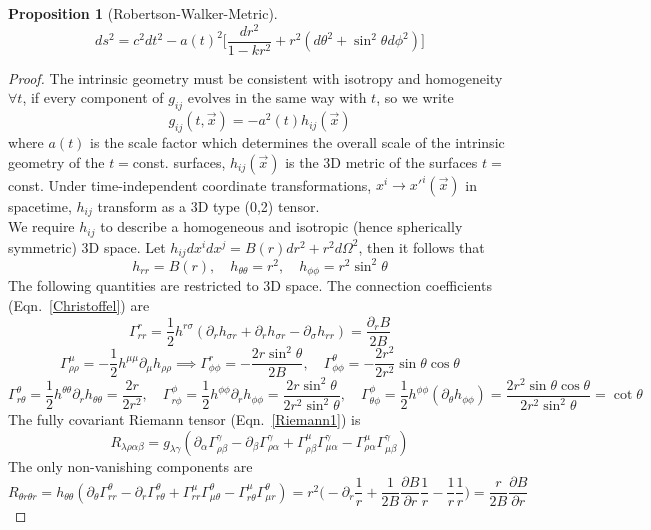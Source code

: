 \documentclass[a4paper]{article}
\theoremstyle{new}
\newtheorem{prop}{Proposition}[section]
\begin{document}
\begin{prop}[Robertson-Walker-Metric]
\begin{equation}
ds^2=c^2dt^2-a(t)^2\bigg[\frac{dr^2}{1-kr^2}+r^2(d\theta^2+\sin^2\theta d\phi^2)\bigg]\label{RWM}
\end{equation}
\end{prop}
\begin{proof}
The intrinsic geometry must be consistent with isotropy and homogeneity $\forall t$, if every component of $g_{ij}$ evolves in the same way with $t$, so we write
\begin{equation}
g_{ij}(t,\vec{x})=-a^2(t)h_{ij}(\vec{x})\label{scale}
\end{equation}
where $a(t)$ is the scale factor which determines the overall scale of the intrinsic geometry of the $t=$const. surfaces, $h_{ij}(\vec{x})$ is the 3D metric of the surfaces $t=$const. Under time-independent coordinate transformations, $x^i\rightarrow x'^i(\vec{x})$ in spacetime, $h_{ij}$ transform as a 3D type (0,2) tensor.\\[5pt]
We require $h_{ij}$ to describe a homogeneous and isotropic (hence spherically symmetric) 3D space. Let $h_{ij}dx^idx^j=B(r)dr^2+r^2d\Omega^2$, then it follows that
$$h_{rr}=B(r),\quad h_{\theta\theta}=r^2,\quad h_{\phi\phi}=r^2\sin^2\theta$$
The following quantities are restricted to 3D space. The connection coefficients (Eqn.~\ref{Christoffel}) are
$$\Gamma_{rr}^r=\frac{1}{2}h^{r\sigma}(\partial_r h_{\sigma r}+\partial_r h_{\sigma r}-\partial_\sigma h_{rr})=\frac{\partial_rB}{2B}$$
$$\Gamma_{\rho\rho}^\mu=-\frac{1}{2}h^{\mu\mu}\partial_\mu h_{\rho\rho}\implies\Gamma_{\phi\phi}^r=-\frac{2r\sin^2\theta}{2B},\quad\Gamma_{\phi\phi}^\theta=-\frac{2r^2}{2r^2}\sin\theta\cos\theta$$
$$\Gamma_{r\theta}^\theta=\frac{1}{2}h^{\theta\theta}\partial_r h_{\theta\theta}=\frac{2r}{2r^2},\quad\Gamma^\phi_{r\phi}=\frac{1}{2}h^{\phi\phi}\partial_rh_{\phi\phi}=\frac{2r\sin^2\theta}{2r^2\sin^2\theta},\quad\Gamma^\phi_{\theta\phi}=\frac{1}{2}h^{\phi\phi}(\partial_\theta h_{\phi\phi})=\frac{2r^2\sin\theta\cos\theta}{2r^2\sin^2\theta}=\cot\theta$$
The fully covariant Riemann tensor (Eqn.~\ref{Riemann1}) is
$$R_{\lambda\rho\alpha\beta}=g_{\lambda\gamma}(\partial_\alpha\Gamma^\gamma_{\rho\beta}-\partial_\beta\Gamma^\gamma_{\rho\alpha}+\Gamma^\mu_{\rho\beta}\Gamma_{\mu\alpha}^\gamma-\Gamma_{\rho\alpha}^\mu\Gamma^\gamma_{\mu\beta})$$
The only non-vanishing components are
$$R_{\theta r\theta r}=h_{\theta\theta}(\partial_\theta\Gamma^\theta_{rr}-\partial_r\Gamma^\theta_{r\theta}+\Gamma^\mu_{rr}\Gamma^\theta_{\mu\theta}-\Gamma^\mu_{r\theta}\Gamma^\theta_{\mu r})=r^2\bigg(-\partial_r\frac{1}{r}+\frac{1}{2B}\frac{\partial B}{\partial r}\frac{1}{r}-\frac{1}{r}\frac{1}{r}\bigg)=\frac{r}{2B}\frac{\partial B}{\partial r}$$

\end{proof}
\end{document}
